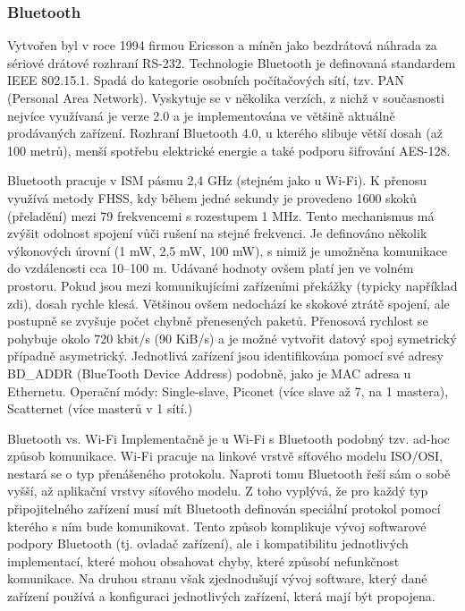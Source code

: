 \subsubsection{Bluetooth}
Vytvořen byl v roce 1994 firmou Ericsson a míněn jako bezdrátová náhrada za sériové drátové rozhraní RS-232.
Technologie Bluetooth je definovaná standardem IEEE 802.15.1. Spadá do kategorie osobních počítačových sítí, tzv. PAN (Personal Area Network). Vyskytuje se v několika verzích, z nichž v současnosti nejvíce využívaná je verze 2.0 a je implementována ve většině aktuálně prodávaných zařízení. Rozhraní Bluetooth 4.0, u kterého slibuje větší dosah (až 100 metrů), menší spotřebu elektrické energie a také podporu šifrování AES-128.

Bluetooth pracuje v ISM pásmu 2,4 GHz (stejném jako u Wi-Fi). K přenosu využívá metody FHSS, kdy během jedné sekundy je provedeno 1600 skoků (přeladění) mezi 79 frekvencemi s rozestupem 1 MHz. 
Tento mechanismus má zvýšit odolnost spojení vůči rušení na stejné frekvenci. Je definováno několik výkonových úrovní (1 mW, 2,5 mW, 100 mW), s nimiž je umožněna komunikace do vzdálenosti cca 10–100 m. Udávané hodnoty ovšem platí jen ve volném prostoru. Pokud jsou mezi komunikujícími zařízeními překážky (typicky například zdi), dosah rychle klesá. Většinou ovšem nedochází ke skokové ztrátě spojení, ale postupně se zvyšuje počet chybně přenesených paketů.
Přenosová rychlost se pohybuje okolo 720 kbit/s (90 KiB/s) a je možné vytvořit datový spoj symetrický případně asymetrický. Jednotlivá zařízení jsou identifikována pomocí své adresy BD\_ADDR (BlueTooth Device Address) podobně, jako je MAC adresa u Ethernetu. Operační módy: Single-slave, Piconet (více slave až 7, na 1 mastera), Scatternet (více masterů v 1 sítí.)


Bluetooth vs. Wi-Fi
Implementačně je u Wi-Fi s Bluetooth podobný tzv. ad-hoc způsob komunikace. Wi-Fi pracuje na linkové vrstvě síťového modelu ISO/OSI, nestará se o typ přenášeného protokolu. Naproti tomu Bluetooth řeší sám o sobě vyšší, až aplikační vrstvy síťového modelu. Z toho vyplývá, že pro každý typ připojitelného zařízení musí mít Bluetooth definován speciální protokol pomocí kterého s ním bude komunikovat. Tento způsob komplikuje vývoj softwarové podpory Bluetooth (tj. ovladač zařízení), ale i kompatibilitu jednotlivých implementací, které mohou obsahovat chyby, které způsobí nefunkčnost komunikace. Na druhou stranu však zjednodušují vývoj software, který dané zařízení používá a konfiguraci jednotlivých zařízení, která mají být propojena.

